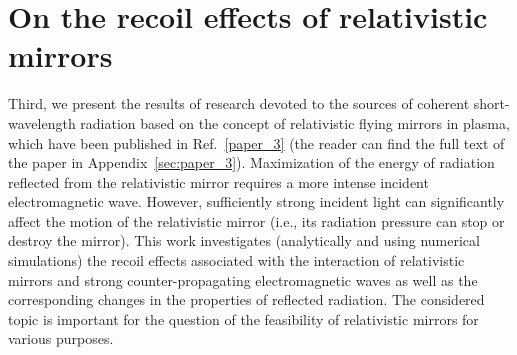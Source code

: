 \documentclass[10pt, a4paper, twoside, openright]{report}
\begin{document}
\section{On the recoil effects of relativistic mirrors\label{sec:on_the_recoil_effects_of_relativistic_mirrors}}
%

Third, we present the results of research devoted to the sources of coherent short-wavelength radiation based on the concept of relativistic flying mirrors in plasma, which have been published in Ref.~\ref{paper_3} (the reader can find the full text of the paper in Appendix~\ref{sec:paper_3}). Maximization of the energy of radiation reflected from the relativistic mirror requires a more intense incident electromagnetic wave. However, sufficiently strong incident light can significantly affect the motion of the relativistic mirror (i.e., its radiation pressure can stop or destroy the mirror). This work investigates (analytically and using numerical simulations) the recoil effects associated with the interaction of relativistic mirrors and strong counter-propagating electromagnetic waves as well as the corresponding changes in the properties of reflected radiation. The considered topic is important for the question of the feasibility of relativistic mirrors for various purposes.

\end{document}

